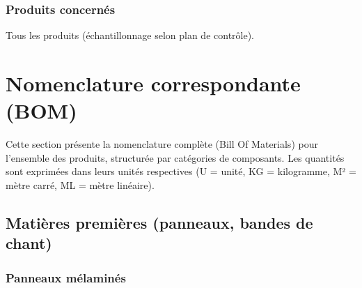 \documentclass[12pt,a4paper]{article}
\begin{document}
\subsubsection{Produits concernés}
Tous les produits (échantillonnage selon plan de contrôle).

\section{Nomenclature correspondante (BOM)}

Cette section présente la nomenclature complète (Bill Of Materials) pour l'ensemble des produits, structurée par catégories de composants. Les quantités sont exprimées dans leurs unités respectives (U = unité, KG = kilogramme, M² = mètre carré, ML = mètre linéaire).

\subsection{Matières premières (panneaux, bandes de chant)}

\subsubsection{Panneaux mélaminés}
\end{document}
